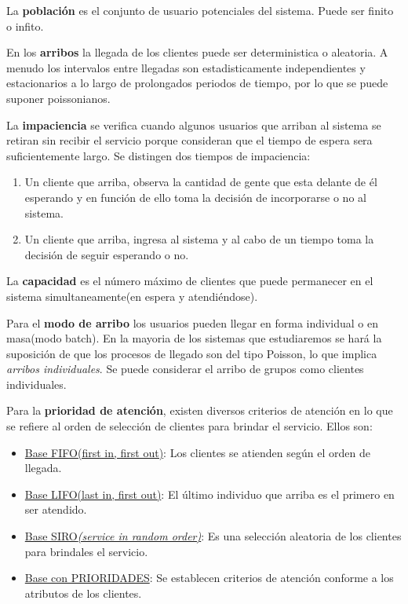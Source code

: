 \documentclass{article}
\begin{document}
La \textbf{población} es el conjunto de usuario potenciales del sistema. Puede ser finito o infito.

En los \textbf{arribos} la llegada de los clientes puede ser deterministica o aleatoria. A menudo los intervalos entre llegadas son estadisticamente independientes y estacionarios a lo largo de prolongados periodos de tiempo, por lo que se puede suponer poissonianos.

La \textbf{impaciencia} se verifica cuando algunos usuarios que arriban al sistema se retiran sin recibir el servicio porque consideran que el tiempo de espera sera suficientemente largo. Se distingen dos tiempos de impaciencia:
\begin{enumerate}
    \item Un cliente que arriba, observa la cantidad de gente que esta delante de él esperando y en función de ello toma la decisión de incorporarse o no al sistema.
    \item Un cliente que arriba, ingresa al sistema y al cabo de un tiempo toma la decisión de seguir esperando o no.
\end{enumerate}

La \textbf{capacidad} es el número máximo de clientes que puede permanecer en el sistema simultaneamente(en espera y atendiéndose).

Para el \textbf{modo de arribo} los usuarios pueden llegar en forma individual o en masa(modo batch). En la mayoria de los sistemas que estudiaremos se hará la suposición de que los procesos de llegado son del tipo Poisson, lo que implica \textit{arribos individuales}. Se puede considerar el arribo de grupos como clientes individuales. 

Para la \textbf{prioridad de atención}, existen diversos criterios de atención en lo que se refiere al orden de selección de clientes para brindar el servicio. Ellos son:

\begin{itemize}
    \item \underline{Base FIFO{(first in, first out)}}: Los clientes se atienden según el orden de llegada.
    \item \underline{Base LIFO{(last in, first out)}}: El último individuo que arriba es el primero en ser atendido.
    \item \underline{Base SIRO\textit{(service in random order)}}: Es una selección aleatoria de los clientes para brindales el servicio. 
    \item \underline{Base con PRIORIDADES}: Se establecen criterios de atención conforme a los atributos de los clientes. 
\end{itemize}
\end{document}

